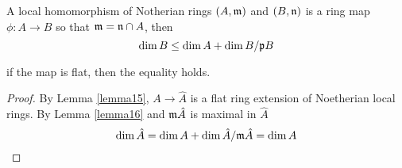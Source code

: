 \begin{lemma}
	\label{lemma16}
	A local homomorphism of Notherian rings $(A, \mathfrak{m})$ and $(B, \mathfrak{n})$ is a ring map $\phi: A \to B$ so that $\mathfrak{m} = \mathfrak{n} \cap A$, then
	$$
	\dim B \leq \dim A + \dim B / \mathfrak{p} B
	$$
	
	if the map is flat, then the equality holds.
\end{lemma}

\begin{proof}
	By Lemma \ref{lemma15}, $A \to \hat{A}$ is a flat ring extension  of Noetherian local rings. By Lemma \ref{lemma16} and $\mathfrak{m} \hat{A}$ is maximal in $\hat{A}$
	$$
		\dim \hat{A} = \dim A + \dim \hat{A} / \mathfrak{m} \hat{A} = \dim A
	$$
\end{proof}
 
 
 
